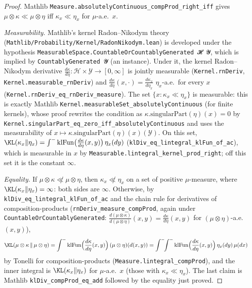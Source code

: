 \begin{proof}
\leanok
Mathlib \texttt{Measure.absolutelyContinuous\_compProd\_right\_iff} gives
$\mu\otimes\kappa \ll \mu\otimes\eta$ iff $\kappa_x \ll \eta_x$ for $\mu$-a.e.\ $x$.

\emph{Measurability.} Mathlib's kernel Radon--Nikodym theory
(\texttt{Mathlib/Probability/Kernel/RadonNikodym.lean}) is developed under the hypothesis
\texttt{MeasurableSpace.CountableOrCountablyGenerated 𝓗 𝓨}, which is implied by
\texttt{CountablyGenerated 𝓨} (an instance). Under it, the kernel Radon--Nikodym
derivative $\frac{d\kappa}{d\eta} : \mathcal{H}\times\mathcal{Y}\to[0,\infty]$ is jointly
measurable (\texttt{Kernel.rnDeriv}, \texttt{Kernel.measurable\_rnDeriv}) and
$\frac{d\kappa}{d\eta}(x,\cdot) = \frac{d\kappa_x}{d\eta_x}$ $\eta_x$-a.e.\ for every $x$
(\texttt{Kernel.rnDeriv\_eq\_rnDeriv\_measure}). The set $\{x : \kappa_x \ll \eta_x\}$ is
measurable: this is exactly Mathlib \texttt{Kernel.measurableSet\_absolutelyContinuous} (for
finite kernels), whose proof rewrites the condition as
$\kappa.\mathrm{singularPart}(\eta)(x) = 0$ by
\texttt{Kernel.singularPart\_eq\_zero\_iff\_absolutelyContinuous} and uses the measurability
of $x \mapsto \kappa.\mathrm{singularPart}(\eta)(x)(\mathcal{Y})$. On this set,
$\KL(\kappa_x\|\eta_x) = \int^-\mathrm{klFun}\big(\tfrac{d\kappa}{d\eta}(x,y)\big)\,\eta_x(dy)$
(\texttt{klDiv\_eq\_lintegral\_klFun\_of\_ac}), which is measurable in $x$ by
\texttt{Measurable.lintegral\_kernel\_prod\_right}; off this set it is the constant $\infty$.

\emph{Equality.} If $\mu\otimes\kappa \not\ll \mu\otimes\eta$, then $\kappa_x\not\ll\eta_x$ on a
set of positive $\mu$-measure, where $\KL(\kappa_x\|\eta_x) = \infty$: both sides are $\infty$.
Otherwise, by \texttt{klDiv\_eq\_lintegral\_klFun\_of\_ac} and the chain rule for derivatives
of composition-products (\texttt{rnDeriv\_measure\_compProd}, again under
\texttt{CountableOrCountablyGenerated}:
$\frac{d(\mu\otimes\kappa)}{d(\mu\otimes\eta)}(x,y) = \frac{d\kappa}{d\eta}(x,y)$ for
$(\mu\otimes\eta)$-a.e.\ $(x,y)$),
\[
  \KL(\mu\otimes\kappa\,\|\,\mu\otimes\eta)
  = \int^- \mathrm{klFun}\Big(\frac{d\kappa}{d\eta}(x,y)\Big)\,(\mu\otimes\eta)(d(x,y))
  = \int^-\!\!\int^- \mathrm{klFun}\Big(\frac{d\kappa}{d\eta}(x,y)\Big)\,\eta_x(dy)\,\mu(dx)
\]
by Tonelli for composition-products (\texttt{Measure.lintegral\_compProd}), and the inner
integral is $\KL(\kappa_x\|\eta_x)$ for $\mu$-a.e.\ $x$ (those with $\kappa_x\ll\eta_x$). The
last claim is Mathlib \texttt{klDiv\_compProd\_eq\_add} followed by the equality just proved.
\end{proof}

